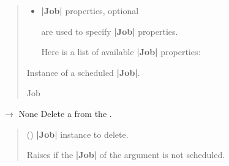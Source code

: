 \documentclass[letterpaper,10pt,english]{sphinxmanual}
\begin{document}
\begin{fulllineitems}
\begin{fulllineitems}
\begin{quote}
\begin{description}
\begin{itemize}
\item {} 
\sphinxAtStartPar
{} \textendash{} 
\sphinxAtStartPar
{\color{red}\bfseries{}|Job|} properties, optional

\sphinxAtStartPar
{} are used to specify {\color{red}\bfseries{}|Job|} properties.

\sphinxAtStartPar
Here is a list of available {\color{red}\bfseries{}|Job|} properties:


\end{itemize}

\sphinxAtStartPar
Instance of a scheduled {\color{red}\bfseries{}|Job|}.

\sphinxAtStartPar
Job

\end{description}\end{quote}

\end{fulllineitems}


\begin{fulllineitems}
\label{\detokenize{index:scheduler.Scheduler.delete_job}}
\pysigstartsignatures
\pysiglinewithargsret
{}
{}
{{ $\rightarrow$ None}}
\pysigstopsignatures
\sphinxAtStartPar
Delete a  from the .
\begin{quote}\begin{description}
\sphinxAtStartPar
{} () \textendash{} {\color{red}\bfseries{}|Job|} instance to delete.

\sphinxAtStartPar
{\hyperref[\detokenize{index:scheduler.SchedulerError}]{}} \textendash{} Raises if the {\color{red}\bfseries{}|Job|} of the argument is not scheduled.

\end{description}\end{quote}

\end{fulllineitems}



\end{fulllineitems}
\end{document}
